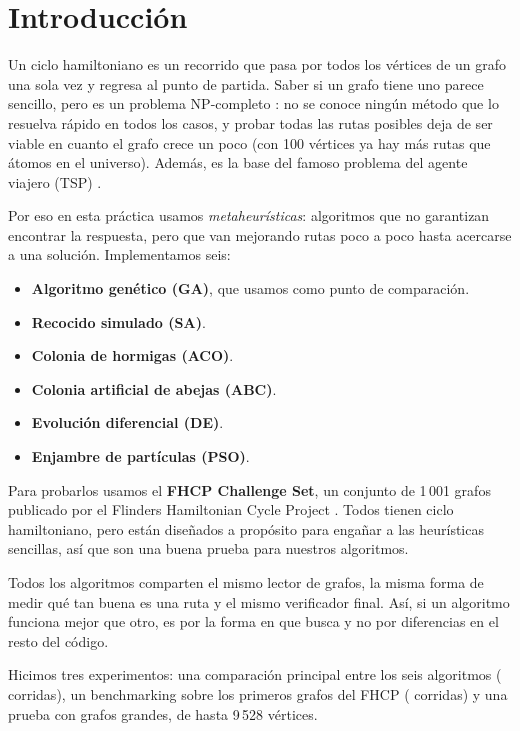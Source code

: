 \chapter{Introducción}
\label{cap:intro}

Un ciclo hamiltoniano es un recorrido que pasa por todos los vértices de un grafo una sola vez y
regresa al punto de partida. Saber si un grafo tiene uno parece sencillo, pero es un problema
NP-completo \cite{de1}: no se conoce ningún método que lo resuelva rápido en todos los casos, y
probar todas las rutas posibles deja de ser viable en cuanto el grafo crece un poco (con 100
vértices ya hay más rutas que átomos en el universo). Además, es la base del famoso problema del
agente viajero (TSP) \cite{sa3}.

Por eso en esta práctica usamos \emph{metaheurísticas}: algoritmos que no garantizan encontrar la
respuesta, pero que van mejorando rutas poco a poco hasta acercarse a una solución. Implementamos
seis:

\begin{itemize}
  \item \textbf{Algoritmo genético (GA)}, que usamos como punto de comparación.
  \item \textbf{Recocido simulado (SA)}.
  \item \textbf{Colonia de hormigas (ACO)}.
  \item \textbf{Colonia artificial de abejas (ABC)}.
  \item \textbf{Evolución diferencial (DE)}.
  \item \textbf{Enjambre de partículas (PSO)}.
\end{itemize}

Para probarlos usamos el \textbf{FHCP Challenge Set}, un conjunto de 1\,001 grafos publicado por
el Flinders Hamiltonian Cycle Project \cite{aco8,aco9}. Todos tienen ciclo hamiltoniano, pero
están diseñados a propósito para engañar a las heurísticas sencillas, así que son una buena prueba
para nuestros algoritmos.

Todos los algoritmos comparten el mismo lector de grafos, la misma forma de medir qué tan buena es
una ruta y el mismo verificador final. Así, si un algoritmo funciona mejor que otro, es por la
forma en que busca y no por diferencias en el resto del código.

Hicimos tres experimentos: una comparación principal entre los seis algoritmos (\ejecA{}
corridas), un benchmarking sobre los primeros \grafosB{} grafos del FHCP (\ejecB{} corridas) y una
prueba con grafos grandes, de hasta 9\,528 vértices.

